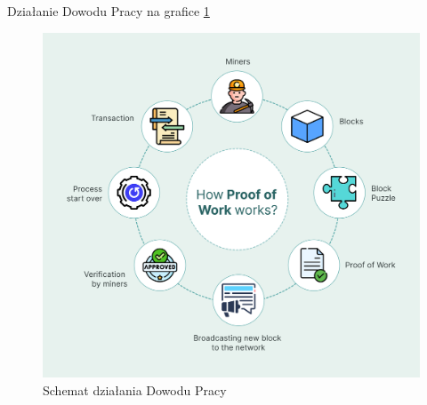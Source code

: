 \vspace{0.3\baselineskip}

Działanie Dowodu Pracy na grafice \ref{fig:ConsesnsusProofOfWork}
\begin{figure}[H]
    \centering
    \includegraphics[width=\textwidth]{Images/ConsesnsusProofOfWork.png}
    \caption{Schemat działania Dowodu Pracy}
    \label{fig:ConsesnsusProofOfWork}
\end{figure}
